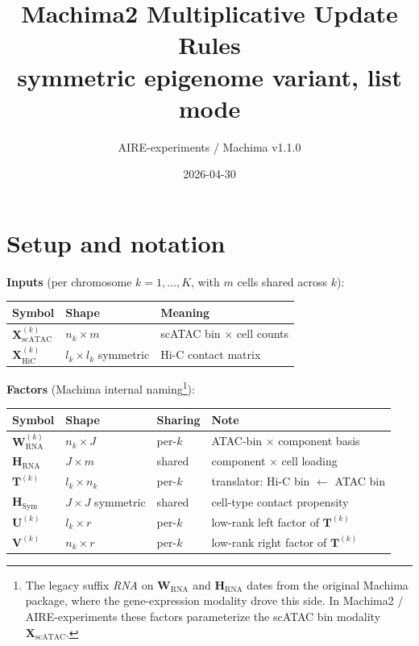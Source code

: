 \documentclass[11pt]{article}
\title{Machima2 Multiplicative Update Rules \\
       \large symmetric epigenome variant, list mode}
\author{AIRE-experiments / Machima v1.1.0}
\date{2026-04-30}
\newcommand{\mat}[1]{\mathbf{#1}}
\newcommand{\sci}[1]{\mathrm{#1}}
\begin{document}
\maketitle

\section{Setup and notation}

\textbf{Inputs} (per chromosome $k = 1, \dots, K$, with $m$ cells shared across $k$):
\begin{center}
\renewcommand{\arraystretch}{1.15}
\begin{tabular}{l l l}
\toprule
Symbol & Shape & Meaning \\
\midrule
$\mat{X}_{\sci{scATAC}}^{(k)}$ & $n_k \times m$              & scATAC bin $\times$ cell counts \\
$\mat{X}_{\sci{HiC}}^{(k)}$    & $l_k \times l_k$ symmetric  & Hi-C contact matrix \\
\bottomrule
\end{tabular}
\end{center}

\textbf{Factors} (Machima internal naming\footnote{The legacy suffix \emph{RNA} on $\mat{W}_{\sci{RNA}}$ and $\mat{H}_{\sci{RNA}}$ dates from the original Machima package, where the gene-expression modality drove this side. In Machima2 / AIRE-experiments these factors parameterize the scATAC bin modality $\mat{X}_{\sci{scATAC}}$.}):
\begin{center}
\renewcommand{\arraystretch}{1.15}
\begin{tabular}{l l l l}
\toprule
Symbol & Shape & Sharing & Note \\
\midrule
$\mat{W}_{\sci{RNA}}^{(k)}$ & $n_k \times J$              & per-$k$  & ATAC-bin $\times$ component basis \\
$\mat{H}_{\sci{RNA}}$       & $J \times m$                & shared   & component $\times$ cell loading \\
$\mat{T}^{(k)}$             & $l_k \times n_k$            & per-$k$  & translator: Hi-C bin $\leftarrow$ ATAC bin \\
$\mat{H}_{\sci{Sym}}$       & $J \times J$ symmetric      & shared   & cell-type contact propensity \\
$\mat{U}^{(k)}$             & $l_k \times r$              & per-$k$  & low-rank left factor of $\mat{T}^{(k)}$ \\
$\mat{V}^{(k)}$             & $n_k \times r$              & per-$k$  & low-rank right factor of $\mat{T}^{(k)}$ \\
\bottomrule
\end{tabular}
\end{center}
\end{document}
